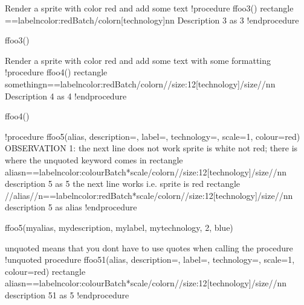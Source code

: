 \documentclass[letterpaper,10pt,english]{sphinxmanual}
\begin{document}
\begin{sphinxVerbatim}[commandchars=\\\{\},numbers=left,firstnumber=1,stepnumber=1]
\PYGZsq{}Render a sprite \PYGZhy{} with color red \PYGZhy{} and add some text
!procedure \PYGZdl{}ffoo3()
    rectangle \PYGZdq{}==label\PYGZbs{}n\PYGZlt{}color:red\PYGZgt{}\PYGZlt{}\PYGZdl{}Batch\PYGZgt{}\PYGZlt{}/color\PYGZgt{}\PYGZbs{}n[technology]\PYGZbs{}n\PYGZbs{}n Description 3\PYGZdq{} as 3
!endprocedure

\PYGZdl{}ffoo3()


\PYGZsq{}Render a sprite \PYGZhy{} with color red \PYGZhy{} and add some text \PYGZhy{} with some formatting
!procedure \PYGZdl{}ffoo4()
    rectangle \PYGZdq{}\PYGZlt{}\PYGZlt{}something\PYGZgt{}\PYGZgt{}\PYGZbs{}n==label\PYGZbs{}n\PYGZlt{}color:red\PYGZgt{}\PYGZlt{}\PYGZdl{}Batch\PYGZgt{}\PYGZlt{}/color\PYGZgt{}\PYGZbs{}n//\PYGZlt{}size:12\PYGZgt{}[technology]\PYGZlt{}/size\PYGZgt{}//\PYGZbs{}n\PYGZbs{}n  Description 4\PYGZdq{} as 4
!endprocedure

\PYGZdl{}ffoo4()



\PYGZsq{}!procedure \PYGZdl{}ffoo5(\PYGZdl{}alias, \PYGZdl{}description=\PYGZdq{}\PYGZdq{}, \PYGZdl{}label=\PYGZdq{}\PYGZdq{}, \PYGZdl{}technology=\PYGZdq{}\PYGZdq{}, \PYGZdl{}scale=1, \PYGZdl{}colour=red)
\PYGZsq{}OBSERVATION 1: the next line does not work \PYGZhy{} sprite is white \PYGZhy{} not red;  there is where the unquoted keyword comes in
\PYGZsq{}rectangle \PYGZdq{}\PYGZlt{}\PYGZlt{}\PYGZdl{}alias\PYGZgt{}\PYGZgt{}\PYGZbs{}n==\PYGZdl{}label\PYGZbs{}n\PYGZlt{}color:\PYGZdl{}colour\PYGZgt{}\PYGZlt{}\PYGZdl{}Batch*\PYGZdl{}scale\PYGZgt{}\PYGZlt{}/color\PYGZgt{}\PYGZbs{}n//\PYGZlt{}size:12\PYGZgt{}[\PYGZdl{}technology]\PYGZlt{}/size\PYGZgt{}//\PYGZbs{}n\PYGZbs{}n  \PYGZdl{}description 5\PYGZdq{} as 5
\PYGZsq{}the next line works i.e. sprite is red
\PYGZsq{}rectangle \PYGZdq{}\PYGZlt{}\PYGZlt{}//\PYGZdl{}alias//\PYGZgt{}\PYGZgt{}\PYGZbs{}n==\PYGZdl{}label\PYGZbs{}n\PYGZdq{}\PYGZlt{}color:red\PYGZgt{}\PYGZlt{}\PYGZdl{}Batch*\PYGZdl{}scale\PYGZgt{}\PYGZlt{}/color\PYGZgt{}\PYGZdq{}\PYGZbs{}n//\PYGZlt{}size:12\PYGZgt{}[\PYGZdl{}technology]\PYGZlt{}/size\PYGZgt{}//\PYGZbs{}n\PYGZbs{}n  \PYGZdl{}description 5\PYGZdq{} as \PYGZdl{}alias
\PYGZsq{}!endprocedure

\PYGZsq{}\PYGZdl{}ffoo5(\PYGZdq{}myalias\PYGZdq{}, \PYGZdq{}mydescription\PYGZdq{}, \PYGZdq{}mylabel\PYGZdq{}, \PYGZdq{}mytechnology\PYGZdq{}, 2, blue)




\PYGZsq{}unquoted means that you don\PYGZsq{}t have to use quotes when calling the procedure
!unquoted procedure \PYGZdl{}ffoo51(\PYGZdl{}alias, \PYGZdl{}description=\PYGZdq{}\PYGZdq{}, \PYGZdl{}label=\PYGZdq{}\PYGZdq{}, \PYGZdl{}technology=\PYGZdq{}\PYGZdq{}, \PYGZdl{}scale=1, \PYGZdl{}colour=red)
    rectangle \PYGZdq{}\PYGZlt{}\PYGZlt{}\PYGZdl{}alias\PYGZgt{}\PYGZgt{}\PYGZbs{}n==\PYGZdl{}label\PYGZbs{}n\PYGZlt{}color:\PYGZdl{}colour\PYGZgt{}\PYGZlt{}\PYGZdl{}Batch*\PYGZdl{}scale\PYGZgt{}\PYGZlt{}/color\PYGZgt{}\PYGZbs{}n//\PYGZlt{}size:12\PYGZgt{}[\PYGZdl{}technology]\PYGZlt{}/size\PYGZgt{}//\PYGZbs{}n\PYGZbs{}n  \PYGZdl{}description 51\PYGZdq{} as 5
!endprocedure


\end{sphinxVerbatim}
\end{document}

